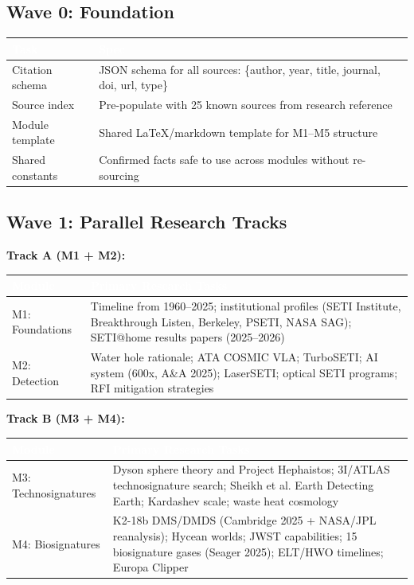 \documentclass[11pt,letterpaper]{article}
\newcommand{\tableheader}[1]{\textbf{\sffamily\textcolor{white}{#1}}}
\begin{document}
\subsection{Wave 0: Foundation}

\begin{center}
\begin{tabularx}{\textwidth}{L{3.5cm}X}
\toprule
{}
\tableheader{Task} & \tableheader{Spec} \\
\midrule
Citation schema & JSON schema for all sources: \{author, year, title, journal, doi, url, type\} \\
Source index & Pre-populate with 25 known sources from research reference \\
Module template & Shared LaTeX/markdown template for M1--M5 structure \\
Shared constants & Confirmed facts safe to use across modules without re-sourcing \\
\bottomrule
\end{tabularx}
\end{center}

\subsection{Wave 1: Parallel Research Tracks}

\textbf{Track A (M1 + M2):}

\begin{center}
\begin{tabularx}{\textwidth}{L{3cm}X}
\toprule
{}
\tableheader{Module} & \tableheader{Primary Research Tasks} \\
\midrule
M1: Foundations & Timeline from 1960--2025; institutional profiles (SETI Institute, Breakthrough Listen, Berkeley, PSETI, NASA SAG); SETI@home results papers (2025--2026) \\
M2: Detection & Water hole rationale; ATA COSMIC VLA; TurboSETI; AI system (600x, A\&A 2025); LaserSETI; optical SETI programs; RFI mitigation strategies \\
\bottomrule
\end{tabularx}
\end{center}

\textbf{Track B (M3 + M4):}

\begin{center}
\begin{tabularx}{\textwidth}{L{3cm}X}
\toprule
{}
\tableheader{Module} & \tableheader{Primary Research Tasks} \\
\midrule
M3: Technosignatures & Dyson sphere theory and Project Hephaistos; 3I/ATLAS technosignature search; Sheikh et al. Earth Detecting Earth; Kardashev scale; waste heat cosmology \\
M4: Biosignatures & K2-18b DMS/DMDS (Cambridge 2025 + NASA/JPL reanalysis); Hycean worlds; JWST capabilities; 15 biosignature gases (Seager 2025); ELT/HWO timelines; Europa Clipper \\
\bottomrule
\end{tabularx}
\end{center}
\end{document}
